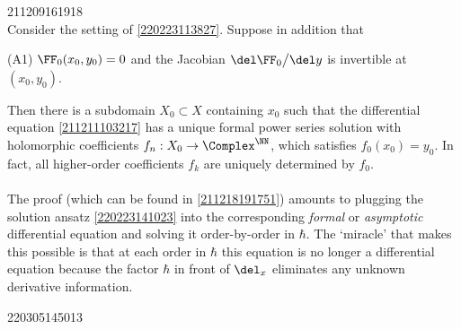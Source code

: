 \documentclass[11pt]{article}
\begin{document}
\begin{thm}{211209161918}
\mbox{}\\
Consider the setting of \autoref{220223113827}.
Suppose in addition that 
\begin{itemise}
\item [\textup{(A1)}] $\FF_0 (x_0, y_0) = 0$ and the Jacobian $\del \FF_0 \big/ \del y$ is invertible at $(x_0, y_0)$.
\end{itemise}
Then there is a subdomain $X_0 \subset X$ containing $x_0$ such that the differential equation \eqref{211211103217} has a unique formal power series solution
with holomorphic coefficients $f_n : X_0 \to \Complex^\NN$, which satisfies $f_0 (x_0) = y_0$.
In fact, all higher-order coefficients $f_k$ are uniquely determined by $f_0$.
%
\end{thm}

\paragraph{}
The proof (which can be found in \autoref{211218191751}) amounts to plugging the solution ansatz \eqref{220223141023} into the corresponding \textit{formal} or \textit{asymptotic} differential equation 
and solving it order-by-order in $\hbar$.
The `miracle' that makes this possible is that at each order in $\hbar$ this equation is no longer a differential equation because the factor $\hbar$ in front of $\del_x$ eliminates any unknown derivative information.

\begin{rem}{220305145013}
\end{rem}
\end{document}
